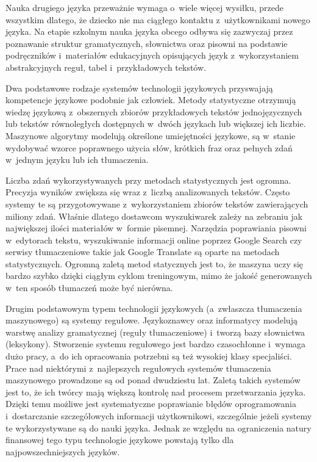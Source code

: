 \begin{multicols}{2}

Nauka drugiego języka przeważnie wymaga o~wiele więcej wysiłku,
przede wszystkim dlatego, że dziecko nie ma ciągłego kontaktu
z~użytkownikami nowego języka. Na etapie szkolnym nauka języka
obcego odbywa się zazwyczaj przez poznawanie struktur gramatycznych,
słownictwa oraz pisowni na podstawie podręczników i~materiałów
edukacyjnych opisujących język z~wykorzystaniem abstrakcyjnych
reguł, tabel i~przykładowych tekstów. 


Dwa podstawowe rodzaje systemów technologii językowych przyswajają
kompetencje językowe podobnie jak człowiek. Metody statystyczne
otrzymują wiedzę językową z~obszernych zbiorów przykładowych
tekstów jednojęzycznych lub tekstów równoległych dostępnych
w~dwóch językach lub większej ich liczbie. Maszynowe algorytmy
modelują określone umiejętności językowe, są w~stanie wydobywać
wzorce poprawnego użycia słów, krótkich fraz oraz pełnych zdań
w~jednym języku lub ich tłumaczenia. 

Liczba zdań wykorzystywanych przy metodach statystycznych jest
ogromna. Precyzja wyników zwiększa się wraz z~liczbą analizowanych
tekstów. Często systemy te są przygotowywane z~wykorzystaniem
zbiorów tekstów zawierających miliony zdań. Właśnie dlatego
dostawcom wyszukiwarek zależy na zebraniu jak największej ilości
materiałów w~formie pisemnej. Narzędzia poprawiania pisowni
w~edytorach tekstu, wyszukiwanie informacji online poprzez Google
Search czy serwisy tłumaczeniowe takie jak Google Translate są
oparte na metodach statystycznych. Ogromną zaletą metod statycznych
jest to, że maszyna uczy się bardzo szybko dzięki ciągłym cyklom
treningowym, mimo że jakość generowanych w~ten sposób tłumaczeń
może być nierówna. 

Drugim podstawowym typem technologii językowych (a~zwłaszcza
tłumaczenia maszynowego) są systemy regułowe. Językoznawcy oraz
informatycy modelują warstwę analizy gramatycznej (reguły
tłumaczeniowe) i~tworzą bazy słownictwa (leksykony). Stworzenie
systemu regułowego jest bardzo czasochłonne i~wymaga dużo pracy,
a~do ich opracowania potrzebni są też wysokiej klasy specjaliści.
Prace nad niektórymi z~najlepszych regułowych systemów tłumaczenia
maszynowego prowadzone są od ponad dwudziestu lat. Zaletą takich
systemów jest to, że ich twórcy mają większą kontrolę nad
procesem przetwarzania języka. Dzięki temu możliwe jest
systematyczne poprawianie błędów oprogramowania i~dostarczanie
szczegółowych informacji użytkownikowi, szczególnie jeżeli
systemy te wykorzystywane są do nauki języka. Jednak ze względu na
ograniczenia natury finansowej tego typu technologie językowe
powstają tylko dla najpowszechniejszych języków. 


\end{multicols}
